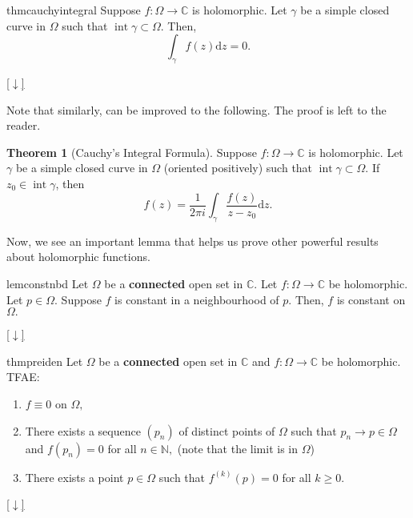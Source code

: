 \documentclass[12pt,oneside]{book}
\theoremstyle{definition}
\newtheorem{thm}{Theorem}
\numberwithin{thm}{chapter}
\newcommand{\downsym}{[$\downarrow$]}
\begin{document}
\begin{restatable}{thm}{cauchyintegral}
\label{thm:cauchyintegral}
	Suppose $f:\Omega \to \mathbb{C}$ is holomorphic. Let $\gamma$ be a simple closed curve in $\Omega$ such that $\operatorname{int} \gamma \subset \Omega.$ Then,
	\begin{equation*} 
		\int_{\gamma}^{} f(z) \mathrm{d}z = 0.
	\end{equation*}
\end{restatable}
\begin{flushright}\hyperref[thm:cauchyintegral2]{\downsym}\end{flushright}

Note that similarly,  can be improved to the following. The proof is left to the reader.

\begin{thm}[Cauchy's Integral Formula]\label{thm:cifreal}
	Suppose $f:\Omega \to \mathbb{C}$ is holomorphic. Let $\gamma$ be a simple closed curve in $\Omega$ (oriented positively) such that $\operatorname{int} \gamma \subset \Omega.$ If $z_0 \in \operatorname{int}\gamma$, then
	\begin{equation*} 
		f(z) = \frac{1}{2\pi i}\int_{\gamma}^{} \frac{f(z)}{z - z_0} \mathrm{d}z.
	\end{equation*}
\end{thm}

Now, we see an important lemma that helps us prove other powerful results about holomorphic functions.

\begin{restatable}[]{lem}{constnbd}
\label{lem:constnbd}
	Let $\Omega$ be a \textbf{connected} open set in $\mathbb{C}.$ Let $f:\Omega \to \mathbb{C}$ be holomorphic. Let $p \in \Omega.$ Suppose $f$ is constant in a neighbourhood of $p.$ Then, $f$ is constant on $\Omega.$
\end{restatable}
\begin{flushright}\hyperref[lem:constnbd2]{\downsym}\end{flushright}

\begin{restatable}[]{thm}{preiden}
\label{thm:preiden}
	Let $\Omega$ be a \textbf{connected} open set in $\mathbb{C}$ and $f:\Omega \to \mathbb{C}$ be holomorphic.\\
	TFAE:
	\begin{enumerate}[label = (\roman*)]
		\item $f \equiv 0$ on $\Omega,$
		\item There exists a sequence $(p_n)$ of distinct points of $\Omega$ such that $p_n \to p \in \Omega$ and $f(p_n) = 0$ for all $n \in \mathbb{N},$ (note that the limit is in $\Omega$)
		\item There exists a point $p \in \Omega$ such that $f^{(k)}(p) = 0$ for all $k \ge 0.$
	\end{enumerate}
\end{restatable}
\begin{flushright}\hyperref[thm:preiden2]{\downsym}\end{flushright}
\end{document}
